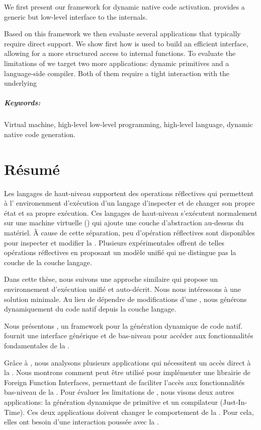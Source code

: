 \documentclass[a4paper,11pt,twoside]{include/ThesisStyle}
\begin{document}
We first present \B our framework for dynamic native code activation.
\B provides a generic but low-level interface to the \VM internals.

Based on this framework we then evaluate several applications that typically require direct \VM support.
We show first how \B is used to build an efficient \FFI interface, allowing for a more structured access to \VM internal functions.
To evaluate the limitations of \B we target two more applications: dynamic primitives and a language-side \JIT compiler.
Both of them require a tight interaction with the underlying \VM

\paragraph{Keywords:} Virtual machine, high-level low-level programming, high-level language, dynamic native code generation.

\chapter*{Résumé}
Les langages de haut-niveau supportent des operations réflectives qui permettent à l’ environenment d’exécution d’un langage d’inspecter et de changer son propre état et sa propre exécution.
Ces langages de haut-niveau s’exécutent normalement sur une machine virtuelle (\VM) qui ajoute une couche d’abstraction au-dessus du matériel.
À cause de cette séparation, peu d’opération réflectives sont disponibles pour inspecter et modifier la \VM.
Plusieurs \VMs expérimentales offrent de telles opérations réflectives en proposant un modèle unifié qui ne distingue pas la couche \VM de la couche langage. 

Dans cette thèse, nous suivons une approche similaire qui propose un environnement d’exécution unifié et auto-décrit.
Nous nous intéressons à une solution minimale.
Au lieu de dépendre de modifications d’une \VM, nous générons dynamiquement du code natif depuis la couche langage. 

Nous présentons \B, un framework pour la génération dynamique de code natif.
\B fournit une interface générique et de bas-niveau pour accéder aux fonctionnalités fondamentales de la \VM.

Grâce à \B, nous analysons plusieurs applications qui nécessitent un accès direct à la \VM.
Nous montrons comment \B peut être utilisé pour implémenter une librairie de Foreign Function Interfaces, permettant de faciliter l’accès aux fonctionnalités bas-niveau de la \VM.
Pour évaluer les limitations de \B, nous visons deux autres applications: la génération dynamique de primitive et un compilateur \JIT (Just-In-Time).
Ces deux applications doivent changer le comportement de la \VM.
Pour cela, elles ont besoin d’une interaction poussée avec la \VM.
\end{document}

